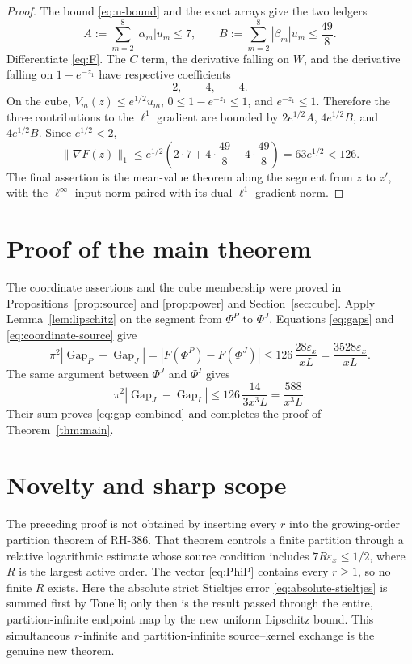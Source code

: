 \documentclass[11pt]{article}
\theoremstyle{definition}
\theoremstyle{remark}
\newcommand{\eps}{\varepsilon}
\newcommand{\PhiP}{\Phi^{P}}
\newcommand{\PhiJ}{\Phi^{J}}
\newcommand{\PhiI}{\Phi^{I}}
\newcommand{\GapP}{\operatorname{Gap}_{P}}
\newcommand{\GapJ}{\operatorname{Gap}_{J}}
\newcommand{\GapI}{\operatorname{Gap}_{I}}
\begin{document}
\begin{proof}
The bound \eqref{eq:u-bound} and the exact arrays give the two ledgers
\begin{equation}
 A:=\sum_{m=2}^8|\alpha_m|u_m\le7,\qquad
 B:=\sum_{m=2}^8|\beta_m|u_m\le\frac{49}{8}.
 \label{eq:AB}
\end{equation}
Differentiate \eqref{eq:F}.  The $C$ term, the derivative falling on
$W$, and the derivative falling on $1-e^{-z_1}$ have respective
coefficients
\begin{equation}
 2,\qquad4,\qquad4.
 \label{eq:derivative-terms}
\end{equation}
On the cube, $V_m(z)\le e^{1/2}u_m$, $0\le1-e^{-z_1}\le1$, and
$e^{-z_1}\le1$.  Therefore the three contributions to the $\ell^1$
gradient are bounded by $2e^{1/2}A$, $4e^{1/2}B$, and
$4e^{1/2}B$.  Since $e^{1/2}<2$,
\[
 \|\nabla F(z)\|_1
 \le e^{1/2}\left(2\cdot7+4\cdot\frac{49}{8}
                         +4\cdot\frac{49}{8}\right)
 =63e^{1/2}<126.
\]
The final assertion is the mean-value theorem along the segment from
$z$ to $z'$, with the $\ell^\infty$ input norm paired with its dual
$\ell^1$ gradient norm.
\end{proof}

\section{Proof of the main theorem}

The coordinate assertions and the cube membership were proved in
Propositions~\ref{prop:source} and \ref{prop:power} and
Section~\ref{sec:cube}.  Apply Lemma~\ref{lem:lipschitz} on the segment
from $\PhiP$ to $\PhiJ$.  Equations \eqref{eq:gaps} and
\eqref{eq:coordinate-source} give
\[
 \pi^2|\GapP-\GapJ|
 =|F(\PhiP)-F(\PhiJ)|
 \le126\,\frac{28\eps_x}{ xL}
 =\frac{3528\eps_x}{ xL}.
\]
The same argument between $\PhiJ$ and $\PhiI$ gives
\[
 \pi^2|\GapJ-\GapI|
 \le126\,\frac{14}{3x^3L}=\frac{588}{ x^3L}.
\]
Their sum proves \eqref{eq:gap-combined} and completes the proof of
Theorem~\ref{thm:main}.

\section{Novelty and sharp scope}

The preceding proof is not obtained by inserting every $r$ into the
growing-order partition theorem of RH-386.  That theorem controls a
finite partition through a relative logarithmic estimate whose source
condition includes $7R\eps_x\le1/2$, where $R$ is the largest active
order.  The vector \eqref{eq:PhiP} contains every $r\ge1$, so no finite
$R$ exists.  Here the absolute strict Stieltjes error
\eqref{eq:absolute-stieltjes} is summed first by Tonelli; only then is the
result passed through the entire, partition-infinite endpoint map by the
new uniform Lipschitz bound.  This simultaneous $r$-infinite and
partition-infinite source--kernel exchange is the genuine new theorem.
\end{document}
